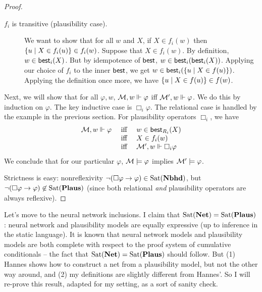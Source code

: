 \documentclass[letterpaper]{article}
\begin{document}
\begin{proof}
\begin{description}
        \item[$f_i$ is transitive (plausibility case).]
        We want to show that for all $w$ and $X$, if $X \in f_i(w)$ then $\{ u \mid X \in f_i(u) \} \in f_i(w)$.  Suppose that $X \in f_i(w)$.  By definition, $w \in \mathsf{best}_i(X)$.  But by idempotence of $\mathsf{best}$, $w \in \mathsf{best}_i(\mathsf{best}_i(X))$.  Applying our choice of $f_i$ to the inner $\mathsf{best}$, we get $w \in \mathsf{best}_i(\{ u \mid X \in f(u) \})$.  Applying the definition once more, we have $\{ u \mid X \in f(u) \} \in f(w)$.

    \end{description}

    Next, we will show that for all $\varphi, w$, $\mathcal{M}, w \Vdash \varphi$ iff $\mathcal{M}', w \Vdash \varphi$.  We do this by induction on $\varphi$.  The key inductive case is $\Box_i \varphi$.  The relational case is handled by the example in the previous section.  For plausibility operators $\Box_i$, we have
    \[
    \begin{array}{lcl}
        \mathcal{M}, w \Vdash \varphi & \mbox{ iff } & w \in \mathsf{best}_{R_i}(X) \\
        & \mbox{ iff } & X \in f_i(w) \\
        & \mbox{ iff } & \mathcal{M}', w \Vdash \Box_i \varphi
    \end{array}
    \]
    We conclude that for our particular $\varphi$, $\mathcal{M} \models \varphi$ implies $\mathcal{M}' \models \varphi$.

    Strictness is easy: nonreflexivity $\neg (\Box \varphi \to \varphi) \in \mathrm{Sat}( \textrm{\textbf{Nbhd}} )$, but $\neg (\Box \varphi \to \varphi) \not \in \mathrm{Sat}( \textrm{\textbf{Plaus}} )$ (since both relational \emph{and} plausibility operators are always reflexive).
\end{proof}

Let's move to the neural network inclusions.  I claim that $\mathrm{Sat}( \textrm{\textbf{Net}} ) = \mathrm{Sat}( \textrm{\textbf{Plaus}} )$: neural network and plausibility models are equally expressive (up to inference in the static language).  It is known that neural network models and plausibility models are both complete with respect to the proof system of cumulative conditionals \cite{leitgeb2001nonmonotonic, leitgeb2003nonmonotonic} -- the fact that $\mathrm{Sat}( \textrm{\textbf{Net}} ) = \mathrm{Sat}( \textrm{\textbf{Plaus}} )$ should follow.  But (1) Hannes shows how to construct a net from a plausibility model, but not the other way around, and (2) my definitions are slightly different from Hannes'.  So I will re-prove this result, adapted for my setting, as a sort of sanity check.
\end{document}
